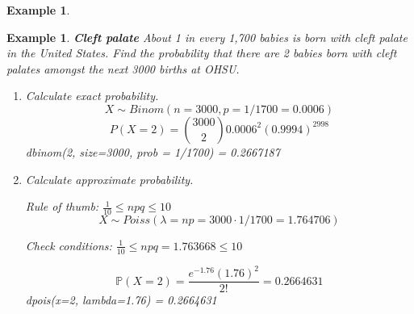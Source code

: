 \documentclass[12pt]{amsart}
\newtheorem{example}[theorem]{Example}
\newcommand{\bP}{\mathbb{P}}
\begin{document}
{\begin{example}
\begin{enumerate}
\vfill
\end{enumerate}


\end{example} 
	
\newpage


\begin{example}  \textbf{Cleft palate} \newline
About 1 in every 1,700 babies is born with cleft palate in the United States. Find the probability that there are 2 babies born with cleft palates amongst the next 3000 births at OHSU. 


\begin{enumerate}
\item Calculate exact probability.
\color{blue}
$$X\sim Binom(n = 3000, p = 1/1700 = 0.0006)$$
$$
P(X =  2) = {3000\choose 2}0.0006^2(0.9994)^{2998} 
$$
dbinom(2, size=3000, prob = 1/1700) = 0.2667187

\color{black}

\vfill


\item Calculate approximate probability.

\color{blue}
Rule of thumb: $\frac{1}{10} \leq npq \leq 10$
$$X\sim Poiss(\lambda = np = 3000\cdot1/1700 = 1.764706)$$

Check conditions: $\frac{1}{10} \leq npq = 1.763668 \leq 10$\newline

$$\bP(X = 2) = \frac{e^{-1.76}(1.76)^{2}}{2!}  =0.2664631$$
dpois(x=2, lambda=1.76) =  0.2664631

\color{black}
\vfill

\end{enumerate}


\end{example} 


}  %
\end{document}
